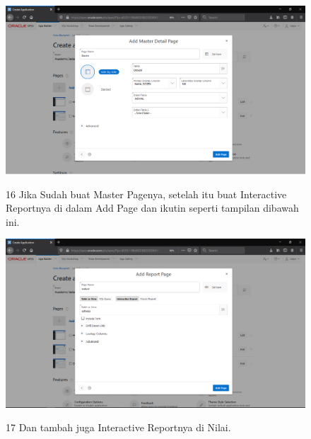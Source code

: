 \begin{enumerate}
\begin{figure}
    \begin{center}
\includegraphics[scale=0.2]{figures/29.png}
    \caption{\textit{}}
        \end{center}
\label{gambar}
\end{figure}


\begin{figure}
\item[16]Jika Sudah buat Master Pagenya, setelah itu buat Interactive Reportnya di dalam Add Page dan ikutin seperti tampilan dibawah ini.

    \begin{center}
\includegraphics[scale=0.2]{figures/30.png}
    \caption{\textit{}}
        \end{center}
\label{gambar}
\end{figure}


\begin{figure}
\item[17]Dan tambah juga Interactive Reportnya di Nilai.


\end{figure}
\end{enumerate}
